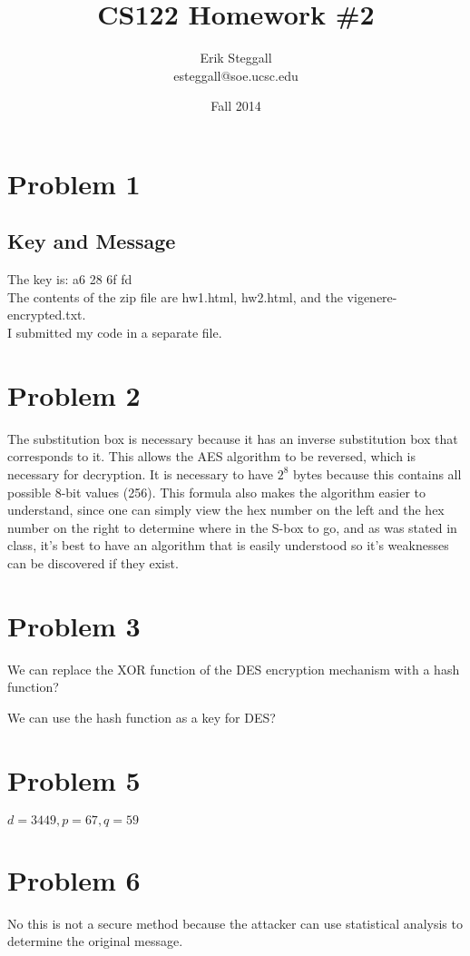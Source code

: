 \documentclass{article}
\title{CS122 Homework \#2}
\author{Erik Steggall \\ esteggall@soe.ucsc.edu}
\date{Fall 2014}
\begin{document}
 \maketitle \pagestyle{empty}
\section*{Problem 1}
\subsection*{Key and Message}
The key is: a6 28 6f fd\\
The contents of the zip file are hw1.html, hw2.html, and the vigenere-encrypted.txt.\\
I submitted my code in a separate file.\\
\section*{Problem 2}
The substitution box is necessary because it has an inverse substitution box that corresponds to it. This allows the AES algorithm to be reversed, which is necessary for decryption. It is necessary to have $2^8$ bytes because this contains all possible 8-bit values (256). This formula also makes the algorithm easier to understand, since one can simply view the hex number on the left and the hex number on the right to determine where in the S-box to go, and as was stated in class, it's best to have an algorithm that is easily understood so it's weaknesses can be discovered if they exist.\\

\section*{Problem 3}
We can replace the XOR function of the DES encryption mechanism with a hash function? 

We can use the hash function as a key for DES?

\section*{Problem 5}
$d = 3449, p = 67, q = 59 $



\section*{Problem 6}
No this is not a secure method because the attacker can use statistical analysis to determine the original message.\\
\end{document}
